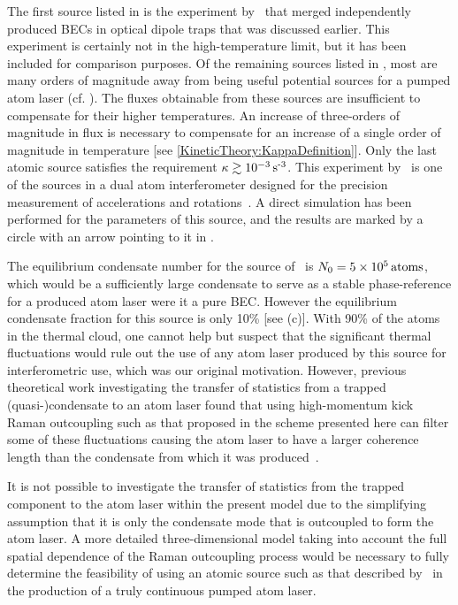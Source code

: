The first source listed in  is the experiment by~\citet{Chikkatur:2002qa} that merged independently produced BECs in optical dipole traps that was discussed earlier.  This experiment is certainly not in the high-temperature limit, but it has been included for comparison purposes.  Of the remaining sources listed in , most are many orders of magnitude away from being useful potential sources for a pumped atom laser (cf. ).  The fluxes obtainable from these sources are insufficient to compensate for their higher temperatures. An increase of three-orders of magnitude in flux is necessary to compensate for an increase of a single order of magnitude in temperature [see \eqref{KineticTheory:KappaDefinition}].  Only the last atomic source satisfies the requirement $\kappa \gtrsim \unit[10^{-3}]{s\textsuperscript{-3}}$.  This experiment by~\citet{Muller:2007} is one of the sources in a dual atom interferometer designed for the precision measurement of accelerations and rotations~\citep{Muller:2009}.  A direct simulation has been performed for the parameters of this source, and the results are marked by a circle with an arrow pointing to it in .  

The equilibrium condensate number for the source of~\citet{Muller:2007} is $N_0 = \unit[5 \times 10^5]{atoms}$, which would be a sufficiently large condensate to serve as a stable phase-reference for a produced atom laser were it a pure BEC.  However the equilibrium condensate fraction for this source is only 10\% [see (c)].  With 90\% of the atoms in the thermal cloud, one cannot help but suspect that the significant thermal fluctuations would rule out the use of any atom laser produced by this source for interferometric use, which was our original motivation.  However, previous theoretical work investigating the transfer of statistics from a trapped (quasi-)condensate to an atom laser found that using high-momentum kick Raman outcoupling such as that proposed in the scheme presented here can filter some of these fluctuations causing the atom laser to have a larger coherence length than the condensate from which it was produced~\citep{Proukakis:2003}.  

It is not possible to investigate the transfer of statistics from the trapped component to the atom laser within the present model due to the simplifying assumption that it is only the condensate mode that is outcoupled to form the atom laser.  A more detailed three-dimensional model taking into account the full spatial dependence of the Raman outcoupling process would be necessary to fully determine the feasibility of using an atomic source such as that described by~\citet{Muller:2007} in the production of a truly continuous pumped atom laser.

